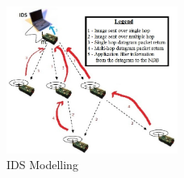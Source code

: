 \documentclass[conference]{IEEEtran}
\begin{document}
\begin{figure}[btp]
    \centering
    \includegraphics[width=0.5\textwidth]{IDS}
    \caption{IDS Modelling}
    \label{fig:ids_model}
\end{figure}
\end{document}

